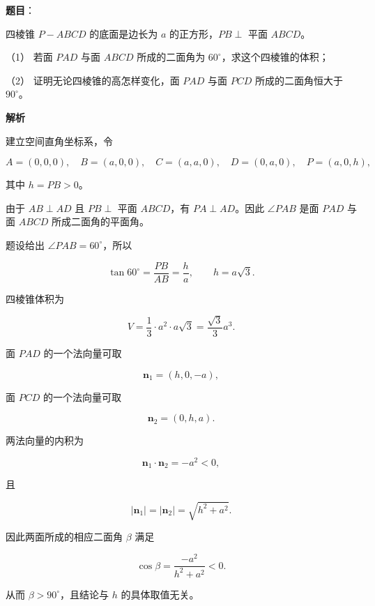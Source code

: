 \begin{answer}

\textbf{题目}：

四棱锥 $P-ABCD$ 的底面是边长为 $a$ 的正方形，$PB\perp$ 平面 $ABCD$。
\nopagebreak[4]
\begin{center}\end{center}
\nopagebreak[4]
（1） 若面 $PAD$ 与面 $ABCD$ 所成的二面角为 $60^\circ$，求这个四棱锥的体积；

（2） 证明无论四棱锥的高怎样变化，面 $PAD$ 与面 $PCD$ 所成的二面角恒大于 $90^\circ$。

\textbf{解析}

建立空间直角坐标系，令

\nopagebreak[4]
\[
A=(0,0,0),\quad B=(a,0,0),\quad C=(a,a,0),\quad D=(0,a,0),\quad P=(a,0,h),
\]

其中 $h=PB>0$。


由于 $AB\perp AD$ 且 $PB\perp$ 平面 $ABCD$，有 $PA\perp AD$。因此 $\angle PAB$ 是面 $PAD$ 与面 $ABCD$ 所成二面角的平面角。

题设给出 $\angle PAB=60^\circ$，所以

\nopagebreak[4]
\[
\tan60^\circ=\frac{PB}{AB}=\frac ha,
\qquad h=a\sqrt3.
\]

四棱锥体积为

\nopagebreak[4]
\[
V=\frac13\cdot a^2\cdot a\sqrt3
=\frac{\sqrt3}{3}a^3.
\]


面 $PAD$ 的一个法向量可取

\nopagebreak[4]
\[
\boldsymbol n_1=(h,0,-a),
\]

面 $PCD$ 的一个法向量可取

\nopagebreak[4]
\[
\boldsymbol n_2=(0,h,a).
\]

两法向量的内积为

\nopagebreak[4]
\[
\boldsymbol n_1\cdot\boldsymbol n_2=-a^2<0,
\]

且

\nopagebreak[4]
\[
|\boldsymbol n_1|=|\boldsymbol n_2|=\sqrt{h^2+a^2}.
\]

因此两面所成的相应二面角 $\beta$ 满足

\nopagebreak[4]
\[
\cos\beta
=\frac{-a^2}{h^2+a^2}<0.
\]

从而 $\beta>90^\circ$，且结论与 $h$ 的具体取值无关。



\end{answer}
